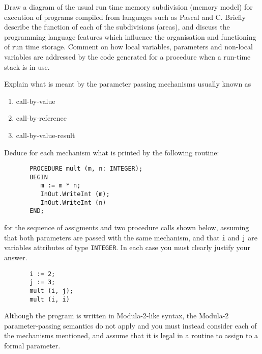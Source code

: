 \begin{questions}
\question

\begin{subquestions}
\subquestion
Draw a diagram of the usual run time memory
subdivision (memory model) for execution of
programs compiled from languages such as
Pascal and C.  Briefly describe the function of each
of the subdivisions (areas), and discuss
the programming language features which influence
the organisation and functioning of run time storage.
Comment on how local variables,
parameters and non-local variables
are addressed by the code generated for a
procedure when a run-time stack is in use.


\subquestion

        Explain what is meant by the parameter passing mechanisms usually
        known as
                \begin{enumerate}
                \item call-by-value
                \item call-by-reference
                \item call-by-value-result
                \end{enumerate}
        Deduce for each mechanism what is printed by the 
	following routine:
\begin{verbatim}
       PROCEDURE mult (m, n: INTEGER); 
       BEGIN
          m := m * n;
          InOut.WriteInt (m);
          InOut.WriteInt (n)
       END; 
\end{verbatim}   
	for the sequence of assigments and two procedure calls
        shown below, assuming that both parameters are
	passed with the same mechanism, and that \verb"i" and
	\verb"j" are variables attributes of type \verb"INTEGER".
        In each case you must clearly justify your answer.
\begin{verbatim}
       i := 2;
       j := 3;
       mult (i, j);
       mult (i, i)
\end{verbatim}
Although the program is written in Modula-2-like syntax, the 
Modula-2 parameter-passing semantics do not apply and you must
instead consider each of the mechanisms mentioned, and assume
that it is legal in a routine to assign to a formal parameter.

\end{subquestions}

\question

\begin{subquestions}


\end{subquestions}
\end{questions}
